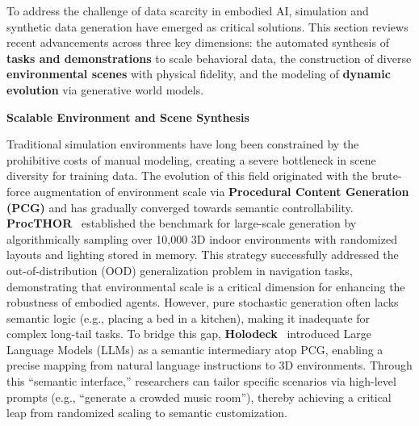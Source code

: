 \documentclass[acmsmall,screen,review,anonymous]{acmart}
\begin{document}
To address the challenge of data scarcity in embodied AI, simulation and synthetic data generation have emerged as critical solutions. This section reviews recent advancements across three key dimensions: the automated synthesis of \textbf{tasks and demonstrations} to scale behavioral data, the construction of diverse \textbf{environmental scenes} with physical fidelity, and the modeling of \textbf{dynamic evolution} via generative world models.

\textbf{Scalable Environment and Scene Synthesis}

Traditional simulation environments have long been constrained by the prohibitive costs of manual modeling, creating a severe bottleneck in scene diversity for training data. The evolution of this field originated with the brute-force augmentation of environment scale via \textbf{Procedural Content Generation (PCG)} and has gradually converged towards semantic controllability. \textbf{ProcTHOR}~\cite{deitke2022procthor} established the benchmark for large-scale generation by algorithmically sampling over 10,000 3D indoor environments with randomized layouts and lighting stored in memory. This strategy successfully addressed the out-of-distribution (OOD) generalization problem in navigation tasks, demonstrating that environmental scale is a critical dimension for enhancing the robustness of embodied agents. However, pure stochastic generation often lacks semantic logic (e.g., placing a bed in a kitchen), making it inadequate for complex long-tail tasks. To bridge this gap, \textbf{Holodeck}~\cite{yang2024holodeck} introduced Large Language Models (LLMs) as a semantic intermediary atop PCG, enabling a precise mapping from natural language instructions to 3D environments. Through this ``semantic interface,'' researchers can tailor specific scenarios via high-level prompts (e.g., ``generate a crowded music room''), thereby achieving a critical leap from randomized scaling to semantic customization.
\end{document}
